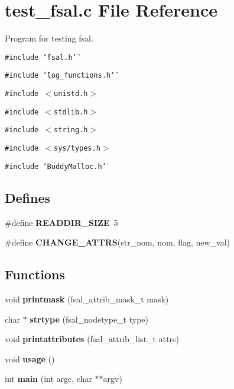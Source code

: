 \section{test\_\-fsal.c File Reference}
\label{test__fsal_8c}
Program for testing fsal. 

{\tt \#include \char`\"{}fsal.h\char`\"{}}\par
{\tt \#include \char`\"{}log\_\-functions.h\char`\"{}}\par
{\tt \#include $<$unistd.h$>$}\par
{\tt \#include $<$stdlib.h$>$}\par
{\tt \#include $<$string.h$>$}\par
{\tt \#include $<$sys/types.h$>$}\par
{\tt \#include \char`\"{}Buddy\-Malloc.h\char`\"{}}\par
\subsection*{Defines}
\begin{CompactItemize}
\item 
\#define {\bf READDIR\_\-SIZE}\ 5\label{test__fsal_8c_a0}

\item 
\#define {\bf CHANGE\_\-ATTRS}(str\_\-nom, nom, flag, new\_\-val)
\end{CompactItemize}
\subsection*{Functions}
\begin{CompactItemize}
\item 
void {\bf printmask} (fsal\_\-attrib\_\-mask\_\-t mask)\label{test__fsal_8c_a2}

\item 
char $\ast$ {\bf strtype} (fsal\_\-nodetype\_\-t type)\label{test__fsal_8c_a3}

\item 
void {\bf printattributes} (fsal\_\-attrib\_\-list\_\-t attrs)\label{test__fsal_8c_a4}

\item 
void {\bf usage} ()\label{test__fsal_8c_a5}

\item 
int {\bf main} (int argc, char $\ast$$\ast$argv)\label{test__fsal_8c_a6}

\end{CompactItemize}


